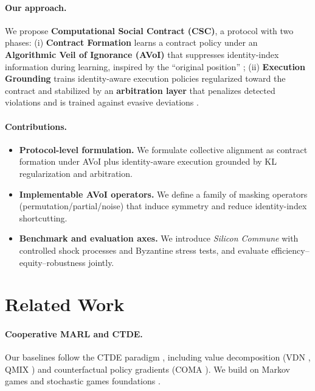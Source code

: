 \documentclass{article}
\theoremstyle{definition}
\theoremstyle{plain}
\theoremstyle{remark}
\begin{document}
\paragraph{Our approach.}
We propose \textbf{Computational Social Contract (CSC)}, a protocol with two phases:
(i) \textbf{Contract Formation} learns a contract policy under an \textbf{Algorithmic Veil of Ignorance (AVoI)} that suppresses identity-index information during learning, inspired by the ``original position'' \citep{rawls1971theory};
(ii) \textbf{Execution Grounding} trains identity-aware execution policies regularized toward the contract and stabilized by an \textbf{arbitration layer} that penalizes detected violations and is trained against evasive deviations \citep{myerson1981optimal,hurwicz2006design}.

\paragraph{Contributions.}
\begin{itemize}
  \item \textbf{Protocol-level formulation.} We formulate collective alignment as contract formation under AVoI plus identity-aware execution grounded by KL regularization and arbitration.
  \item \textbf{Implementable AVoI operators.} We define a family of masking operators (permutation/partial/noise) that induce symmetry and reduce identity-index shortcutting.
  \item \textbf{Benchmark and evaluation axes.} We introduce \textit{Silicon Commune} with controlled shock processes and Byzantine stress tests, and evaluate efficiency--equity--robustness jointly.
\end{itemize}

\section{Related Work}
\label{sec:related}

\paragraph{Cooperative MARL and CTDE.}
Our baselines follow the CTDE paradigm \citep{oliehoek2016concise,bernstein2002complexity}, including value decomposition (VDN \citep{sunehag2017vdn}, QMIX \citep{rashid2018qmix}) and counterfactual policy gradients (COMA \citep{foerster2018coma}).
We build on Markov games and stochastic games foundations \citep{shapley1953stochastic,littman1994markov}.
\end{document}

